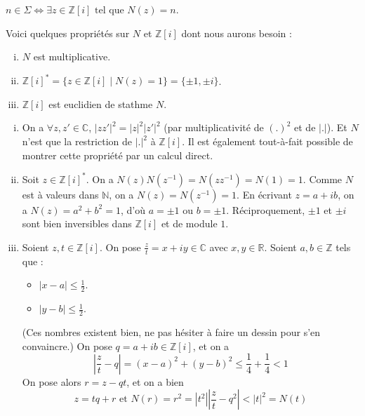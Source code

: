 	\begin{remark}
		\label{theoreme-des-deux-carres-fermat-2}
		$n \in \Sigma \iff \exists z \in \mathbb{Z}[i] \text{ tel que } N(z)=n$.
	\end{remark}

	\begin{lemma}
		\label{theoreme-des-deux-carres-fermat-3}
		Voici quelques propriétés sur $N$ et $\mathbb{Z}[i]$ dont nous aurons besoin :
		\begin{enumerate}[(i)]
			\item $N$ est multiplicative.
			\item $\mathbb{Z}[i]^* = \{ z \in \mathbb{Z}[i] \mid N(z) = 1 \} = \{ \pm 1, \pm i \}$.
			\item $\mathbb{Z}[i]$ est euclidien de stathme $N$.
		\end{enumerate}
	\end{lemma}

	\begin{demonstration}
		\begin{enumerate}[(i)]
			\item On a $\forall z, z' \in \mathbb{C}$, $|zz'|^2 = |z|^2 |z'|^2$ (par multiplicativité de $(.)^2$ et de $|.|$). Et $N$ n'est que la restriction de $|.|^2$ à $\mathbb{Z}[i]$. Il est également tout-à-fait possible de montrer cette propriété par un calcul direct.
			\item Soit $z \in \mathbb{Z}[i]^*$. On a $N(z)N(z^{-1}) = N(zz^{-1}) = N(1) = 1$. Comme $N$ est à valeurs dans $\mathbb{N}$, on a $N(z) = N(z^{-1}) = 1$. En écrivant $z = a+ib$, on a $N(z) = a^2 + b^2 = 1$, d'où $a = \pm 1$ ou $b = \pm 1$. Réciproquement, $\pm 1$ et $\pm i$ sont bien inversibles dans $\mathbb{Z}[i]$ et de module $1$.
			\item Soient $z, t \in \mathbb{Z}[i]$. On pose $\frac{z}{t} = x + iy \in \mathbb{C}$ avec $x, y \in \mathbb{R}$. Soient $a, b \in \mathbb{Z}$ tels que :
			\begin{itemize}
				\item $|x-a| \leq \frac{1}{2}$.
				\item $|y-b| \leq \frac{1}{2}$.
			\end{itemize}
			(Ces nombres existent bien, ne pas hésiter à faire un dessin pour s'en convaincre.) On pose $q = a+ib \in \mathbb{Z}[i]$, et on a
			\[ \left| \frac{z}{t} - q \right| = (x-a)^2 + (y-b)^2 \leq \frac{1}{4} + \frac{1}{4} < 1 \]
			On pose alors $r = z-qt$, et on a bien
			\[ z = tq+r \text{ et } N(r) = r^2 = |t^2| \left| \frac{z}{t} - q^2 \right| < |t|^2 = N(t) \]
		\end{enumerate}
	\end{demonstration}

